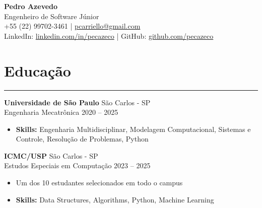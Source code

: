 \documentclass[10pt,a4paper]{article}
\begin{document}
\begin{center}
    {\huge \textbf{Pedro Azevedo}} \\
    Engenheiro de Software Júnior \\
    +55 (22) 99702-3461 \quad | \quad \href{mailto:pcarriello@gmail.com}{pcarriello@gmail.com} \\
    LinkedIn: \href{https://www.linkedin.com/in/pecazeco}{linkedin.com/in/pecazeco} \quad | \quad GitHub: \href{https://github.com/pecazeco}{github.com/pecazeco}
\end{center}

\section*{Educação}
\hrule \vspace{2mm}
\textbf{Universidade de São Paulo} \hfill São Carlos - SP \\
Engenharia Mecatrônica \hfill 2020 -- 2025
\begin{itemize}[nosep]
    \item \textbf{Skills:} Engenharia Multidisciplinar, Modelagem Computacional, Sistemas e Controle, Resolução de Problemas, Python
\end{itemize}

\textbf{ICMC/USP} \hfill São Carlos - SP \\
Estudos Especiais em Computação \hfill 2023 -- 2025
\begin{itemize}[nosep]
    \item Um dos 10 estudantes selecionados em todo o campus
    \item \textbf{Skills:} Data Structures, Algorithms, Python, Machine Learning
\end{itemize}
\end{document}
